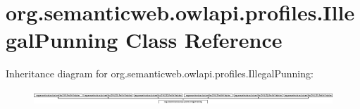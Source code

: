 \hypertarget{classorg_1_1semanticweb_1_1owlapi_1_1profiles_1_1_illegal_punning}{\section{org.\-semanticweb.\-owlapi.\-profiles.\-Illegal\-Punning Class Reference}
\label{classorg_1_1semanticweb_1_1owlapi_1_1profiles_1_1_illegal_punning}
}
Inheritance diagram for org.\-semanticweb.\-owlapi.\-profiles.\-Illegal\-Punning\-:\begin{figure}[H]
\begin{center}
\leavevmode
\includegraphics[height=0.544218cm]{classorg_1_1semanticweb_1_1owlapi_1_1profiles_1_1_illegal_punning}
\end{center}
\end{figure}
